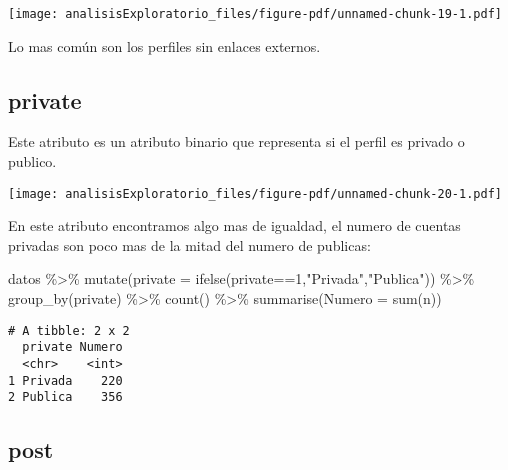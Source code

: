 \documentclass[
  letterpaper,
  DIV=11,
  numbers=noendperiod]{scrreprt}
\newenvironment{Shaded}{\begin{snugshade}}{\end{snugshade}}
\newcommand{\AttributeTok}[1]{\textcolor[rgb]{0.40,0.45,0.13}{#1}}
\newcommand{\DecValTok}[1]{\textcolor[rgb]{0.68,0.00,0.00}{#1}}
\newcommand{\FunctionTok}[1]{\textcolor[rgb]{0.28,0.35,0.67}{#1}}
\newcommand{\NormalTok}[1]{\textcolor[rgb]{0.00,0.23,0.31}{#1}}
\newcommand{\SpecialCharTok}[1]{\textcolor[rgb]{0.37,0.37,0.37}{#1}}
\newcommand{\StringTok}[1]{\textcolor[rgb]{0.13,0.47,0.30}{#1}}
\begin{document}
\texttt{[image: analisisExploratorio\_files/figure-pdf/unnamed-chunk-19-1.pdf]}

Lo mas común son los perfiles sin enlaces externos.

\subsection{private}\label{private}

Este atributo es un atributo binario que representa si el perfil es
privado o publico.

\begin{Shaded}
\end{Shaded}

\texttt{[image: analisisExploratorio\_files/figure-pdf/unnamed-chunk-20-1.pdf]}

En este atributo encontramos algo mas de igualdad, el numero de cuentas
privadas son poco mas de la mitad del numero de publicas:

\begin{Shaded}
\begin{Highlighting}[]
\NormalTok{datos }\SpecialCharTok{\%\textgreater{}\%} \FunctionTok{mutate}\NormalTok{(}\AttributeTok{private =} \FunctionTok{ifelse}\NormalTok{(private}\SpecialCharTok{==}\DecValTok{1}\NormalTok{,}\StringTok{"Privada"}\NormalTok{,}\StringTok{"Publica"}\NormalTok{)) }\SpecialCharTok{\%\textgreater{}\%}  \FunctionTok{group\_by}\NormalTok{(private) }\SpecialCharTok{\%\textgreater{}\%} \FunctionTok{count}\NormalTok{() }\SpecialCharTok{\%\textgreater{}\%}  \FunctionTok{summarise}\NormalTok{(}\AttributeTok{Numero =} \FunctionTok{sum}\NormalTok{(n))  }
\end{Highlighting}
\end{Shaded}

\begin{verbatim}
# A tibble: 2 x 2
  private Numero
  <chr>    <int>
1 Privada    220
2 Publica    356
\end{verbatim}

\subsection{post}\label{post}
\end{document}
